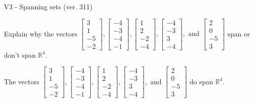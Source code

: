 \begin{exercise}
  \begin{exerciseTitle}V3 - Spanning sets (ver. 311)\end{exerciseTitle}
  \begin{exerciseStatement}
    Explain why the vectors \(\left[\begin{array}{r}
3 \\
1 \\
-5 \\
-2
\end{array}\right] , \left[\begin{array}{r}
-4 \\
-3 \\
-4 \\
-1
\end{array}\right] , \left[\begin{array}{r}
1 \\
2 \\
-2 \\
-4
\end{array}\right] , \left[\begin{array}{r}
-4 \\
-3 \\
3 \\
-4
\end{array}\right] , \text{ and } \left[\begin{array}{r}
2 \\
0 \\
-5 \\
3
\end{array}\right]\) span or don't span \(\mathbb{R}^4\). 
	


  \end{exerciseStatement}
  \begin{exerciseAnswer}
   The vectors \(\left[\begin{array}{r}
3 \\
1 \\
-5 \\
-2
\end{array}\right] , \left[\begin{array}{r}
-4 \\
-3 \\
-4 \\
-1
\end{array}\right] , \left[\begin{array}{r}
1 \\
2 \\
-2 \\
-4
\end{array}\right] , \left[\begin{array}{r}
-4 \\
-3 \\
3 \\
-4
\end{array}\right] , \text{ and } \left[\begin{array}{r}
2 \\
0 \\
-5 \\
3
\end{array}\right]\) 
  	 do  
	span \(\mathbb{R}^4\).
  



\end{exerciseAnswer}
\end{exercise}
